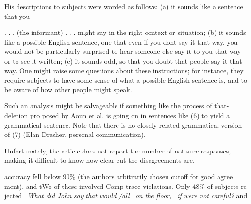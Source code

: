 \setcounter{listWWNumlxleveli}{14}
\begin{listWWNumlxleveli}
\item 
\begin{styleStandard}
His descriptions to subjects were worded as follows: {\textquotedbl}(a) it sounds like a sentence that you
\end{styleStandard}


\end{listWWNumlxleveli}
\begin{styleStandard}
. . . (the informant) . . . might say in the right context or situation; (b) it sounds like a possible English sentence, one that even if you don{\textquotesingle}t say it that way, you would not be particularly surprised to hear someone else say it to you that way or to see it written; (c) it sounds odd, so that you doubt that people say it that way.{\textquotedbl} One might raise some questions about these instructions; for instance, they require subjects to have some sense of what a possible English sentence is, and to be aware of how other people might speak.
\end{styleStandard}


\begin{listWWNumlxleveli}
\item 
\begin{styleStandard}
Such an analysis might be salvageable if something like the process of that-deletion pro\- posed by Aoun et al. is going on in sentences like (6) to yield a grammatical sentence. Note that there is no closely related grammatical version of (7) (Elan Dresher, personal communication).
\end{styleStandard}


\item 
\begin{styleStandard}
Unfortunately, the article does not report the number of {\textquotedbl}not sure{\textquotedbl} responses, making it difficult to know how clear-cut the disagreements are.
\end{styleStandard}


\end{listWWNumlxleveli}
\clearpage\setcounter{page}{1}\begin{styleStandard}
accuracy fell below 90\% (the authors{\textquotesingle} arbitrarily chosen cutoff for good agree\- ment), and tWo of these involved Comp-trace violations. Only 48\% of subjects re\- jected \ \textit{What}\textit{ }\textit{did}\textit{ }\textit{John}\textit{ }\textit{say}\textit{ }\textit{that}\textit{ }\textit{would}\textit{ }\textit{/all \ on}\textit{ }\textit{the}\textit{ }\textit{floor, }\textit{\ }\textit{if }\textit{we{\textquotesingle}re}\textit{ }\textit{not}\textit{ }\textit{careful?}\textit{ }and
\end{styleStandard}


